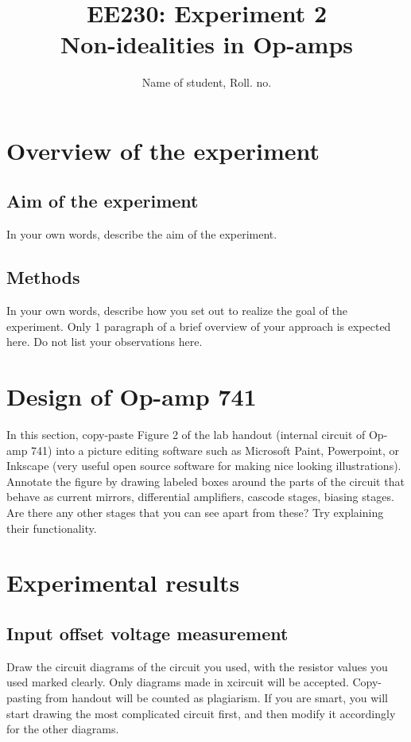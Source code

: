 \documentclass[12pt]{article}
\title{EE230: Experiment 2\\
Non-idealities in Op-amps}
\author{Name of student, Roll. no.}
\begin{document}
\maketitle

\section{Overview of the experiment}

\subsection{Aim of the experiment}

In your own words, describe the aim of the experiment.

\subsection{Methods}

In your own words, describe how you set out to realize the goal of the experiment. Only 1 paragraph of a brief overview of your approach is expected here. Do not list your observations here.

\section{Design of Op-amp 741}

In this section, copy-paste Figure 2 of the lab handout (internal circuit of Op-amp 741) into a picture editing software such as Microsoft Paint, Powerpoint, or Inkscape (very useful open source software for making nice looking illustrations). Annotate the figure by drawing labeled boxes around the parts of the circuit that behave as current mirrors, differential amplifiers, cascode stages, biasing stages. Are there any other stages that you can see apart from these? Try explaining their functionality.

\section{Experimental results}

\subsection{Input offset voltage measurement}

Draw the circuit diagrams of the circuit you used, with the resistor values you used marked clearly. Only diagrams made in xcircuit will be accepted. Copy-pasting from handout will be counted as plagiarism. If you are smart, you will start drawing the most complicated circuit first, and then modify it accordingly for the other diagrams.
\end{document}
